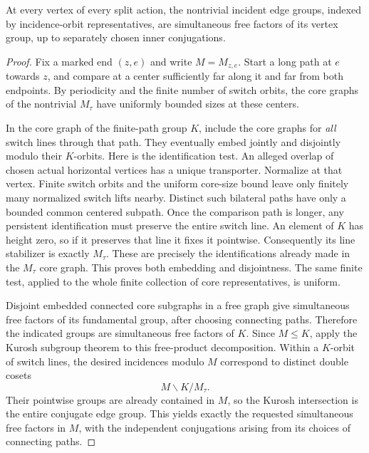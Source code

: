 \begin{lemma}\label{gate:incident-factors}
At every vertex of every split action, the nontrivial incident edge groups,
indexed by incidence-orbit representatives, are simultaneous free factors
of its vertex group, up to separately chosen inner conjugations.
\end{lemma}
\begin{proof}
Fix a marked end $(z,e)$ and write $M=M_{z,e}$.  Start a long path at $e$
towards $z$, and compare at a center sufficiently far along it and far
from both endpoints.  By periodicity and the finite number of switch
orbits, the core graphs of the nontrivial $M_\tau$ have uniformly
bounded sizes at these centers.

In the core graph of the finite-path group $K$, include the core graphs for
\emph{all} switch lines through that path.  They eventually embed jointly
and disjointly modulo their $K$-orbits.  Here is the identification test.
An alleged overlap of chosen actual horizontal vertices has a unique
transporter.  Normalize at that vertex.  Finite switch orbits and the
uniform core-size bound leave only finitely many normalized switch lifts
nearby.  Distinct such bilateral paths have only a bounded common
centered subpath.  Once the comparison path is longer, any persistent
identification must preserve the entire switch line.  An element of $K$
has height zero, so if it preserves that line it fixes it pointwise.
Consequently its line stabilizer is exactly $M_\tau$.  These are precisely
the identifications already made in the $M_\tau$ core graph.  This
proves both embedding and disjointness.  The same finite test, applied
to the whole finite collection of core representatives, is uniform.

Disjoint embedded connected core subgraphs in a free graph give
simultaneous free factors of its fundamental group, after choosing
connecting paths.  Therefore the indicated groups are simultaneous free
factors of $K$.  Since $M\le K$, apply the Kurosh subgroup theorem to
this free-product decomposition.  Within a $K$-orbit of switch lines,
the desired incidences modulo $M$ correspond to distinct double cosets
\[
 M\backslash K/M_\tau.
\]
Their pointwise groups are already contained in $M$, so the Kurosh
intersection is the entire conjugate edge group.  This yields exactly
the requested simultaneous free factors in $M$, with the independent
conjugations arising from its choices of connecting paths.
\end{proof}

